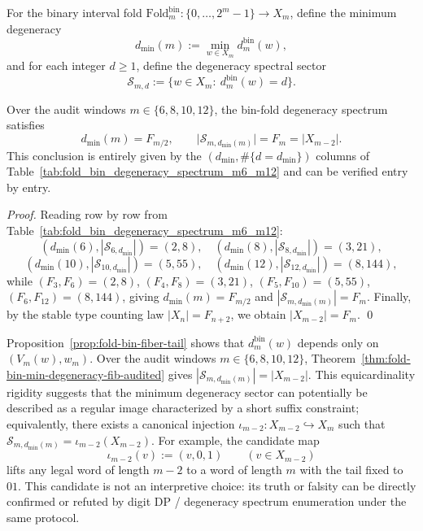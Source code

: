 \begin{definition}\label{def:fold-bin-degeneracy-sectors}
For the binary interval fold \(\mathrm{Fold}^{\mathrm{bin}}_m:\{0,\dots,2^m-1\}\to X_m\),
define the minimum degeneracy
\[
d_{\min}(m):=\min_{w\in X_m} d^{\mathrm{bin}}_m(w),
\]
and for each integer \(d\ge 1\), define the degeneracy spectral sector
\[
\mathcal{S}_{m,d}:=\{w\in X_m:\ d^{\mathrm{bin}}_m(w)=d\}.
\]
\end{definition}

\begin{theorem}\label{thm:fold-bin-min-degeneracy-fib-audited}
Over the audit windows \(m\in\{6,8,10,12\}\), the bin-fold degeneracy spectrum satisfies
\[
d_{\min}(m)=F_{m/2},
\qquad
\bigl|\mathcal{S}_{m,d_{\min}(m)}\bigr|=F_m=|X_{m-2}|.
\]
This conclusion is entirely given by the \((d_{\min},\#\{d=d_{\min}\})\) columns of Table~\ref{tab:fold_bin_degeneracy_spectrum_m6_m12} and can be verified entry by entry.
\end{theorem}
\begin{proof}
Reading row by row from Table~\ref{tab:fold_bin_degeneracy_spectrum_m6_m12}:
\[
(d_{\min}(6),|\mathcal{S}_{6,d_{\min}}|)=(2,8),\quad
(d_{\min}(8),|\mathcal{S}_{8,d_{\min}}|)=(3,21),
\]
\[
(d_{\min}(10),|\mathcal{S}_{10,d_{\min}}|)=(5,55),\quad
(d_{\min}(12),|\mathcal{S}_{12,d_{\min}}|)=(8,144),
\]
while \((F_{3},F_{6})=(2,8)\), \((F_{4},F_{8})=(3,21)\), \((F_{5},F_{10})=(5,55)\), \((F_{6},F_{12})=(8,144)\), giving \(d_{\min}(m)=F_{m/2}\) and \(|\mathcal{S}_{m,d_{\min}(m)}|=F_m\).
Finally, by the stable type counting law \(|X_n|=F_{n+2}\), we obtain \(|X_{m-2}|=F_m\). \qed
\end{proof}

\begin{conjecture}\label{conj:fold-bin-min-sector-regular-subcover}
Proposition~\ref{prop:fold-bin-fiber-tail} shows that \(d^{\mathrm{bin}}_m(w)\) depends only on \((V_m(w),w_m)\).
Over the audit windows \(m\in\{6,8,10,12\}\), Theorem~\ref{thm:fold-bin-min-degeneracy-fib-audited} gives
\(
|\mathcal{S}_{m,d_{\min}(m)}|=|X_{m-2}|
\).
This equicardinality rigidity suggests that the minimum degeneracy sector can potentially be described as a regular image characterized by a short suffix constraint; equivalently, there exists a canonical injection
\(\iota_{m-2}:X_{m-2}\hookrightarrow X_m\) such that
\(
\mathcal{S}_{m,d_{\min}(m)}=\iota_{m-2}(X_{m-2})
\).
For example, the candidate map
\[
\iota_{m-2}(v):=(v,0,1)\qquad (v\in X_{m-2})
\]
lifts any legal word of length \(m-2\) to a word of length \(m\) with the tail fixed to \(01\).
This candidate is not an interpretive choice: its truth or falsity can be directly confirmed or refuted by digit DP / degeneracy spectrum enumeration under the same protocol.
\end{conjecture}

